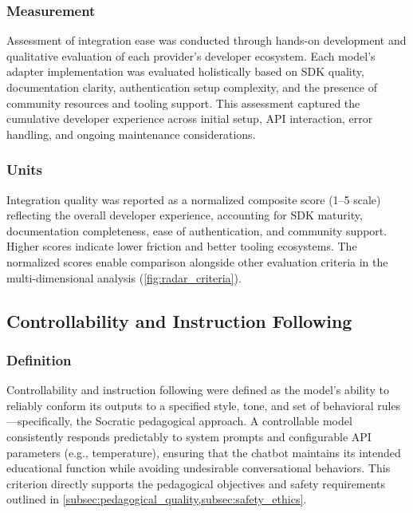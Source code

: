 \subsubsection{Measurement}
\label{subsubsec:integration_measurement}
Assessment of integration ease was conducted through hands-on development and qualitative evaluation of each provider's developer ecosystem. Each model's adapter implementation was evaluated holistically based on SDK quality, documentation clarity, authentication setup complexity, and the presence of community resources and tooling support. This assessment captured the cumulative developer experience across initial setup, API interaction, error handling, and ongoing maintenance considerations.

\subsubsection{Units}
\label{subsubsec:integration_units}
Integration quality was reported as a normalized composite score (1--5 scale) reflecting the overall developer experience, accounting for SDK maturity, documentation completeness, ease of authentication, and community support. Higher scores indicate lower friction and better tooling ecosystems. The normalized scores enable comparison alongside other evaluation criteria in the multi-dimensional analysis (\cref{fig:radar_criteria}).

\subsection{Controllability and Instruction Following}
\label{subsec:explainability_controllability}

\subsubsection{Definition}
\label{subsubsec:explainability_definition}
Controllability and instruction following were defined as the model's ability to reliably conform its outputs to a specified style, tone, and set of behavioral rules—specifically, the Socratic pedagogical approach. A controllable model consistently responds predictably to system prompts and configurable API parameters (e.g., temperature), ensuring that the chatbot maintains its intended educational function while avoiding undesirable conversational behaviors. This criterion directly supports the pedagogical objectives and safety requirements outlined in \cref{subsec:pedagogical_quality,subsec:safety_ethics}.

